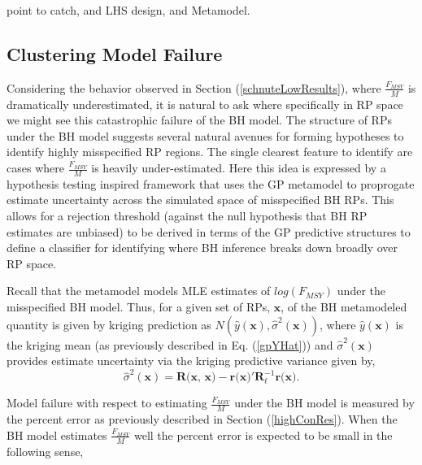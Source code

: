 %
{\color{red}
point to catch, and LHS design, and Metamodel.
}

%
\subsection{Clustering Model Failure}

%
Considering the behavior observed in Section (\ref{schnuteLowResults}), where 
$\frac{F_{MSY}}{M}$ is dramatically underestimated, it is natural to ask 
where specifically in RP space we might see this catastrophic failure of the 
BH model. 
%
The structure of RPs under the BH model suggests several natural avenues for 
forming hypotheses to identify highly misspecified RP regions. The single 
clearest feature to identify are cases where $\frac{F_{MSY}}{M}$ is 
heavily under-estimated. Here this idea is expressed by a hypothesis testing 
inspired framework that uses the GP metamodel to proprogate estimate 
uncertainty across the simulated space of misspecified BH RPs. 
This allows for a rejection threshold (against the null hypothesis that BH RP 
estimates are unbiased) to be derived in terms of the GP predictive structures 
to define a classifier for identifying where BH inference breaks down 
broadly over RP space.


%
\clearpage
%
Recall that the metamodel models MLE estimates of $log(F_{MSY})$ under the misspecified BH model. 
Thus, for a given set of RPs, $\textbf{x}$, of the BH metamodeled 
quantity is given by kriging prediction as $N(\hat y(\textbf{x}), \hat \sigma^2(\textbf{x}))$, 
where $\hat y(\textbf{x})$ is the kriging mean (as previously described in 
Eq. (\ref{gpYHat})) and $\hat \sigma^2(\textbf{x})$ provides estimate 
uncertainty via the kriging predictive variance given by,
\begin{equation} %
       \hat \sigma^2(\textbf{x}) = \textbf{R(x, x)} - \textbf{r(x)}'\bm{R}^{-1}_{\bm{\ell}}\textbf{r(x)}.
\end{equation}

%
Model failure with respect to estimating $\frac{F_{MSY}}{M}$ under the BH 
model is measured by the percent error as previously described in Section (\ref{highConRes}).
When the BH model estimates $\frac{F_{MSY}}{M}$ well the percent error is 
expected to be small in the following sense,

